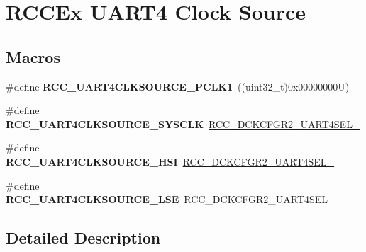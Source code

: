 \hypertarget{group___r_c_c_ex___u_a_r_t4___clock___source}{}\section{R\+C\+C\+Ex U\+A\+R\+T4 Clock Source}
\label{group___r_c_c_ex___u_a_r_t4___clock___source}
\subsection*{Macros}
\begin{DoxyCompactItemize}
\item 
\mbox{\label{group___r_c_c_ex___u_a_r_t4___clock___source_gaff82e747965b83222e9a26cd4ddba10d}} 
\#define {\bfseries R\+C\+C\+\_\+\+U\+A\+R\+T4\+C\+L\+K\+S\+O\+U\+R\+C\+E\+\_\+\+P\+C\+L\+K1}~((uint32\+\_\+t)0x00000000\+U)
\item 
\mbox{\label{group___r_c_c_ex___u_a_r_t4___clock___source_ga4a5e6664b7443bb073f8bc56ee434ef8}} 
\#define {\bfseries R\+C\+C\+\_\+\+U\+A\+R\+T4\+C\+L\+K\+S\+O\+U\+R\+C\+E\+\_\+\+S\+Y\+S\+C\+LK}~\mbox{\hyperlink{group___peripheral___registers___bits___definition_ga41a10b313c60e87a4549730848c3b81e}{R\+C\+C\+\_\+\+D\+C\+K\+C\+F\+G\+R2\+\_\+\+U\+A\+R\+T4\+S\+E\+L\+\_}}
\item 
\mbox{\label{group___r_c_c_ex___u_a_r_t4___clock___source_ga784a4f3f93b632fc639af377fd22d209}} 
\#define {\bfseries R\+C\+C\+\_\+\+U\+A\+R\+T4\+C\+L\+K\+S\+O\+U\+R\+C\+E\+\_\+\+H\+SI}~\mbox{\hyperlink{group___peripheral___registers___bits___definition_ga6082c41328b9042d6dd2b5633cbc4dcd}{R\+C\+C\+\_\+\+D\+C\+K\+C\+F\+G\+R2\+\_\+\+U\+A\+R\+T4\+S\+E\+L\+\_}}
\item 
\mbox{\label{group___r_c_c_ex___u_a_r_t4___clock___source_gaae30868211d2839e9975c496332c23fd}} 
\#define {\bfseries R\+C\+C\+\_\+\+U\+A\+R\+T4\+C\+L\+K\+S\+O\+U\+R\+C\+E\+\_\+\+L\+SE}~R\+C\+C\+\_\+\+D\+C\+K\+C\+F\+G\+R2\+\_\+\+U\+A\+R\+T4\+S\+EL
\end{DoxyCompactItemize}


\subsection{Detailed Description}
